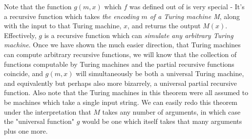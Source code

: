 \documentclass{article}
\theoremstyle{definition}
\theoremstyle{plain}
\theoremstyle{theorem}
\begin{document}
Note that the function $g(m,x)$ which $f$ was defined out of is very special - It's a recursive function which takes \textit{the encoding $m$ of a Turing machine M}, along with the input to that Turing machine, $x$, and returns the output $M(x)$. Effectively, $g$ is a recursive function which can \textit{simulate any arbitrary Turing machine}. Once we have shown the much easier direction, that Turing machines can compute arbitrary recursive functions, we will know that the collection of functions computable by Turing machines and the partial recursive functions coincide, and $g(m,x)$ will simultaneously be both a universal Turing machine, and equivalently but perhaps also more bizarrely, a universal partial recursive function. Also note that the Turing machines in this theorem were all assumed to be machines which take a single input string. We can easily redo this theorem under the interpretation that $M$ takes any number of arguments, in which case the "universal function" $g$ would be one which itself takes that many arguments plus one more.
\iffalse
\end{document}
